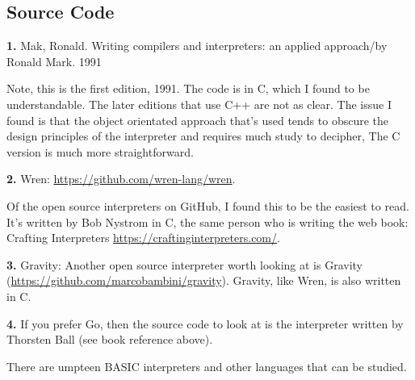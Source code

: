 \subsection{Source Code}

{\bf 1.} Mak, Ronald. Writing compilers and interpreters: an applied approach/by Ronald Mark. 1991

Note, this is the first edition, 1991. The code is in C, which I found to be understandable. The later editions that use C++ are not as clear. The issue I found is that the object orientated approach that's used tends to obscure the design principles of the interpreter and requires much study to decipher, The C version is much more straightforward.

{\bf 2.} Wren: \url{https://github.com/wren-lang/wren}.

Of the open source interpreters on GitHub, I found this to be the easiest to read. It's written by Bob Nystrom in C, the same person who is writing the web book: Crafting Interpreters \url{https://craftinginterpreters.com/}.

{\bf 3.} Gravity:  Another open source interpreter worth looking at is Gravity (\url{https://github.com/marcobambini/gravity}). Gravity, like Wren, is also written in C.

{\bf 4.}  If you prefer Go, then the source code to look at is the interpreter written by Thorsten Ball (see book reference above).

There are umpteen BASIC interpreters and other languages that can be studied.

\bigskip\medskip

\begin{center}
\end{center} 